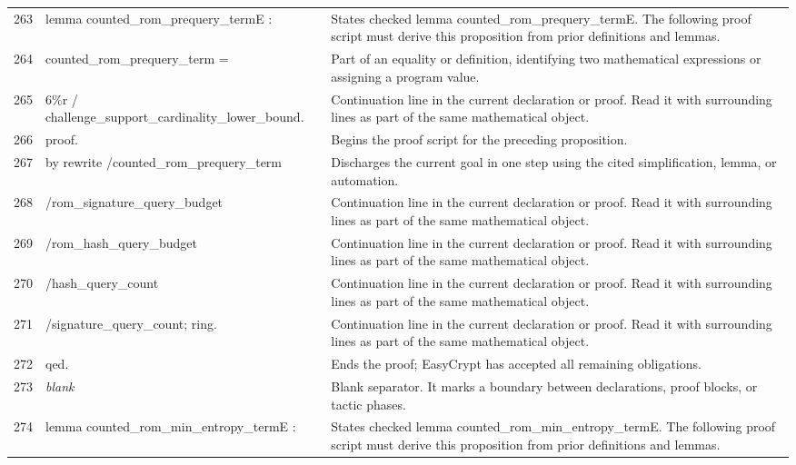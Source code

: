 \documentclass[10pt]{article}
\begin{document}
\begin{longtable}{r L{0.53\textwidth} L{0.37\textwidth}}
263 & {\ttfamily\scriptsize lemma counted\_rom\_prequery\_termE :} & States checked lemma counted\_rom\_prequery\_termE.  The following proof script must derive this proposition from prior definitions and lemmas. \\
264 & {\ttfamily\scriptsize   counted\_rom\_prequery\_term =} & Part of an equality or definition, identifying two mathematical expressions or assigning a program value. \\
265 & {\ttfamily\scriptsize     6\%r / challenge\_support\_cardinality\_lower\_bound.} & Continuation line in the current declaration or proof.  Read it with surrounding lines as part of the same mathematical object. \\
266 & {\ttfamily\scriptsize proof.} & Begins the proof script for the preceding proposition. \\
267 & {\ttfamily\scriptsize by rewrite /counted\_rom\_prequery\_term} & Discharges the current goal in one step using the cited simplification, lemma, or automation. \\
268 & {\ttfamily\scriptsize            /rom\_signature\_query\_budget} & Continuation line in the current declaration or proof.  Read it with surrounding lines as part of the same mathematical object. \\
269 & {\ttfamily\scriptsize            /rom\_hash\_query\_budget} & Continuation line in the current declaration or proof.  Read it with surrounding lines as part of the same mathematical object. \\
270 & {\ttfamily\scriptsize            /hash\_query\_count} & Continuation line in the current declaration or proof.  Read it with surrounding lines as part of the same mathematical object. \\
271 & {\ttfamily\scriptsize            /signature\_query\_count; ring.} & Continuation line in the current declaration or proof.  Read it with surrounding lines as part of the same mathematical object. \\
272 & {\ttfamily\scriptsize qed.} & Ends the proof; EasyCrypt has accepted all remaining obligations. \\
273 & {\ttfamily\scriptsize \emph{blank}} & Blank separator.  It marks a boundary between declarations, proof blocks, or tactic phases. \\
274 & {\ttfamily\scriptsize lemma counted\_rom\_min\_entropy\_termE :} & States checked lemma counted\_rom\_min\_entropy\_termE.  The following proof script must derive this proposition from prior definitions and lemmas. \\

\end{longtable}
\end{document}
